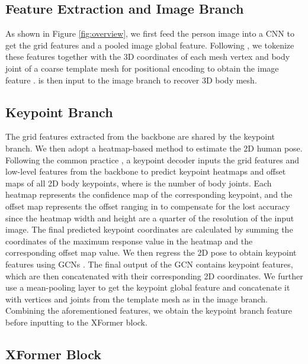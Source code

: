 \documentclass{article}
\begin{document}
\subsection{Feature Extraction and Image Branch}
\label{sec:feature}
As shown in Figure \ref{fig:overview}, we first feed the person image  into a CNN to get the grid features and a pooled image global feature. Following \cite{lin2020end,lin2021-mesh-graphormer}, we tokenize these features together with the 3D coordinates of each mesh vertex and body joint of a coarse template mesh for positional encoding to obtain the image feature .  is then input to the image branch to recover 3D body mesh.

\subsection{Keypoint Branch}
\label{sec:keypoint}

The grid features extracted from the backbone are shared by the keypoint branch. We then adopt a heatmap-based method to estimate the 2D human pose. 
Following the common practice \cite{papandreou2017towards,bazarevsky2020blazepose}, a keypoint decoder inputs the grid features and low-level features from the backbone to predict keypoint heatmaps 
and offset maps 
of all 2D body keypoints, where  is the number of body joints. Each heatmap  represents the confidence map of the corresponding keypoint, and the offset map  represents the offset ranging in  to compensate for the lost accuracy since the heatmap width and height are a quarter of the resolution of the input image. The final predicted keypoint coordinates  are calculated by summing the coordinates of the maximum response value in the heatmap and the corresponding offset map value.
We then regress the 2D pose to obtain keypoint features using GCNs \cite{zhao2019semantic}. 
The final output of the GCN contains  keypoint features, which are then concatenated with their corresponding 2D coordinates. We further use a mean-pooling layer to get the keypoint global feature and concatenate it with vertices and joints from the template mesh as in the image branch. Combining the aforementioned features, we obtain the keypoint branch feature  before inputting to the XFormer block.

\subsection{XFormer Block}
\label{sec:transformer}
\end{document}
